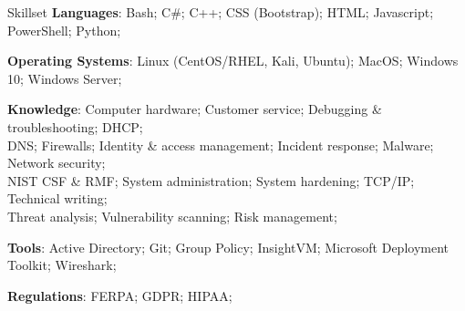 \documentclass{resume} %
\begin{document}
	
	\begin{rSection}{Skillset}
		\textbf{Languages}: Bash; C\#; C++; CSS (Bootstrap); HTML; Javascript; PowerShell; Python;
		
		\textbf{Operating Systems}: Linux (CentOS/RHEL, Kali, Ubuntu); MacOS; Windows 10; Windows Server;
		
		\textbf{Knowledge}: Computer hardware; Customer service; Debugging \& troubleshooting; DHCP;\\DNS; Firewalls; Identity \& access management; Incident response; Malware; Network security;\\NIST CSF \& RMF; System administration; System hardening; TCP/IP; Technical writing;\\Threat analysis; Vulnerability scanning; Risk management;
		
		\textbf{Tools}: Active Directory; Git; Group Policy; InsightVM; Microsoft Deployment Toolkit; Wireshark;
		
		\textbf{Regulations}: FERPA; GDPR; HIPAA;
	\end{rSection}

	
		
	
	
\end{document}
